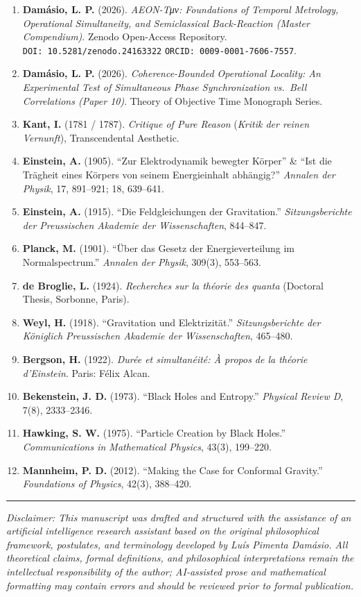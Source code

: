\documentclass[
]{article}
\providecommand{\tightlist}{%
  \setlength{\itemsep}{0pt}\setlength{\parskip}{0pt}}
\begin{document}
\begin{enumerate}
\def\labelenumi{\arabic{enumi}.}
\tightlist
\item
  \textbf{Damásio, L. P.} (2026). \emph{AEON-Tμν: Foundations of
  Temporal Metrology, Operational Simultaneity, and Semiclassical
  Back-Reaction (Master Compendium)}. Zenodo Open-Access Repository.
  \texttt{DOI:\ 10.5281/zenodo.24163322} \textbar{}
  \texttt{ORCID:\ 0009-0001-7606-7557}.
\item
  \textbf{Damásio, L. P.} (2026). \emph{Coherence-Bounded Operational
  Locality: An Experimental Test of Simultaneous Phase Synchronization
  vs.~Bell Correlations (Paper 10)}. Theory of Objective Time Monograph
  Series.
\item
  \textbf{Kant, I.} (1781 / 1787). \emph{Critique of Pure Reason}
  (\emph{Kritik der reinen Vernunft}), Transcendental Aesthetic.
\item
  \textbf{Einstein, A.} (1905). ``Zur Elektrodynamik bewegter Körper''
  \& ``Ist die Trägheit eines Körpers von seinem Energieinhalt
  abhängig?'' \emph{Annalen der Physik}, 17, 891--921; 18, 639--641.
\item
  \textbf{Einstein, A.} (1915). ``Die Feldgleichungen der Gravitation.''
  \emph{Sitzungsberichte der Preussischen Akademie der Wissenschaften},
  844--847.
\item
  \textbf{Planck, M.} (1901). ``Über das Gesetz der Energieverteilung im
  Normalspectrum.'' \emph{Annalen der Physik}, 309(3), 553--563.
\item
  \textbf{de Broglie, L.} (1924). \emph{Recherches sur la théorie des
  quanta} (Doctoral Thesis, Sorbonne, Paris).
\item
  \textbf{Weyl, H.} (1918). ``Gravitation und Elektrizität.''
  \emph{Sitzungsberichte der Königlich Preussischen Akademie der
  Wissenschaften}, 465--480.
\item
  \textbf{Bergson, H.} (1922). \emph{Durée et simultanéité: À propos de
  la théorie d'Einstein}. Paris: Félix Alcan.
\item
  \textbf{Bekenstein, J. D.} (1973). ``Black Holes and Entropy.''
  \emph{Physical Review D}, 7(8), 2333--2346.
\item
  \textbf{Hawking, S. W.} (1975). ``Particle Creation by Black Holes.''
  \emph{Communications in Mathematical Physics}, 43(3), 199--220.
\item
  \textbf{Mannheim, P. D.} (2012). ``Making the Case for Conformal
  Gravity.'' \emph{Foundations of Physics}, 42(3), 388--420.
\end{enumerate}

\begin{center}\rule{0.5\linewidth}{0.5pt}\end{center}

\emph{Disclaimer: This manuscript was drafted and structured with the
assistance of an artificial intelligence research assistant based on the
original philosophical framework, postulates, and terminology developed
by Luís Pimenta Damásio. All theoretical claims, formal definitions, and
philosophical interpretations remain the intellectual responsibility of
the author; AI-assisted prose and mathematical formatting may contain
errors and should be reviewed prior to formal publication.}
\end{document}
